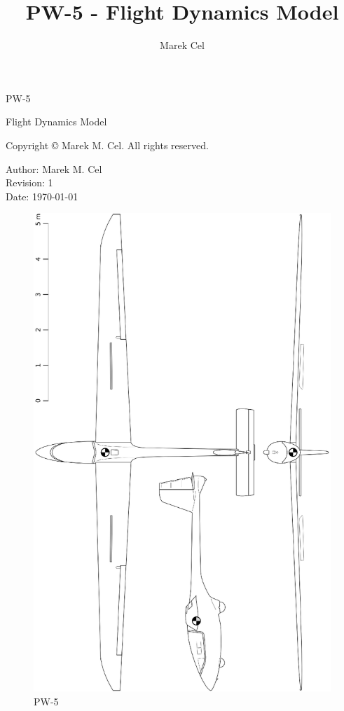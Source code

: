 \documentclass[12pt,a4paper]{article}
\title{PW-5 - Flight Dynamics Model}
\author{Marek Cel}
\date{}
\begin{document}
  
  \begin{titlepage}
    \centering
    {\huge PW-5 \par Flight Dynamics Model\par}
  \end{titlepage}
  

  \noindent Copyright \copyright{} \the\year{} Marek M. Cel. All rights reserved.

  \noindent Author: Marek M. Cel \\
  Revision: 1 \\
  Date: \today

  
  \clearpage
  \thispagestyle{empty}
  
  \begin{figure}[p]
    \centering
    \includegraphics[width=180mm]{eps/pw5_3view.eps}
    \caption{PW-5}
  \end{figure}

  \restoregeometry

  {
    \clearpage
    \setlength{\parskip}{0em}
    \tableofcontents
  }

  
  
  \clearpage
   
  
  
\end{document}
